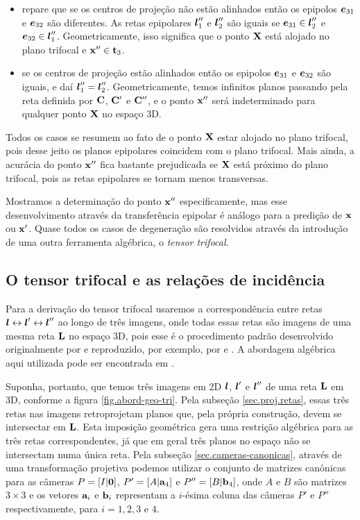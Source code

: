 \begin{itemize}
\item repare que se os centros de projeção não estão alinhados então os epipolos $\boldsymbol{e}_{31}$ e $\boldsymbol{e}_{32}$ são diferentes. As retas epipolares $\boldsymbol{l}''_1$ e $\boldsymbol{l}''_2$ são iguais se $\boldsymbol{e}_{31}\in\boldsymbol{l}''_2$ e $\boldsymbol{e}_{32}\in\boldsymbol{l}''_1$. Geometricamente, isso significa que o ponto $\mathbf{X}$ está alojado no plano trifocal e $\mathbf{x}''\in{\bf t}_3$.

\item se os centros de projeção estão alinhados então os epipolos $\boldsymbol{e}_{31}$ e $\boldsymbol{e}_{32}$ são iguais, e daí $\boldsymbol{l}''_1=\boldsymbol{l}''_2$. Geometricamente, temos infinitos planos passando pela reta definida por ${\bf C}$, ${\bf C}'$ e ${\bf C}''$, e o ponto $\mathbf{x}''$ será indeterminado para qualquer ponto $\mathbf{X}$ no espaço 3D.
\end{itemize}

Todos os casos se resumem ao fato de o ponto $\mathbf{X}$ estar alojado no plano trifocal, pois desse jeito os planos epipolares coincidem com o plano trifocal. Mais ainda, a acurácia do ponto $\mathbf{x}''$ fica bastante prejudicada se $\mathbf{X}$ está próximo do plano trifocal, pois as retas epipolares se tornam menos transversas. 

Mostramos a determinação do ponto $\mathbf{x}''$ especificamente, mas esse desenvolvimento através da transferência epipolar é análogo para a predição de $\mathbf{x}$ ou $\mathbf{x}'$. Quase todos os casos de degeneração são resolvidos através da introdução de uma outra ferramenta algébrica, o {\it tensor trifocal}.

\subsection{O tensor trifocal e as relações de incidência}\label{sec.tensor-tri-rela-inci}

Para a derivação do tensor trifocal usaremos a correspondência entre retas $\boldsymbol{l}\leftrightarrow\boldsymbol{l}'\leftrightarrow\boldsymbol{l}''$ ao longo de três imagens, onde todas essas retas são imagens de uma mesma reta $\bf L$ no espaço 3D, pois esse é o procedimento padrão desenvolvido originalmente por 
\citep{original-trifocal-retas} e reproduzido, por exemplo, por  \citep{Faugeras} e \citep{forsyth}. A abordagem algébrica aqui utilizada pode ser encontrada em \citep{Hartley2004}.

Suponha, portanto, que temos três imagens em 2D $\boldsymbol{l}$, $\boldsymbol{l}'$ e $\boldsymbol{l}''$  de uma reta ${\bf L}$ em 3D, conforme a figura \ref{fig.abord-geo-tri}. Pela subseção \ref{sec.proj.retas}, essas três retas nas imagens retroprojetam planos que, pela própria construção, devem se intersectar em ${\bf L}$. Esta imposição geométrica gera uma restrição algébrica para as três retas correspondentes, já que em geral três planos no espaço não se intersectam numa única reta. Pela subseção \ref{sec.cameras-canonicas}, através de uma transformação projetiva podemos utilizar o conjunto de matrizes canônicas para as câmeras $P=[I|{\bf 0}]$, $P'=[A|{\bf a}_4]$ e $P''=[B|{\bf b}_4]$, onde $A$ e $B$ são matrizes $3\times3$ e os vetores ${\bf a}_i$ e ${\bf b}_i$ representam a $i$-ésima coluna das câmeras $P'$ e $P''$ respectivamente, para $i=1,2,3 \,\,\text{e}\,\, 4$.

